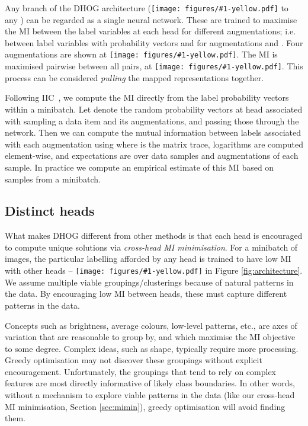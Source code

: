 \documentclass[runningheads]{llncs}
\newcommand*\yellowcircle[1]{\protect\texttt{[image: figures/\#1-yellow.pdf]}}
\begin{document}
Any branch of the DHOG architecture (\yellowcircle{1} to any ) can be regarded as a single neural network. These are trained to maximise the MI between the label variables at each head for different augmentations; i.e. between label variables with probability vectors  and  for augmentations  and . Four augmentations are shown at \yellowcircle{1}. The MI is maximised pairwise between all pairs, at \yellowcircle{4}. This process can be considered \emph{pulling} the mapped representations together.


Following IIC~\cite{ji2019invariant}, we compute the MI directly from the label probability vectors within a minibatch. Let  denote the random probability vectors at head  associated with sampling a data item and its augmentations, and passing those through the network. 
Then we can compute the mutual information between labels associated with each augmentation using
{}
where  is the matrix trace, logarithms are computed element-wise, and expectations are over data samples and augmentations of each sample. In practice we compute an empirical estimate of this MI based on samples from a minibatch.







\subsection{Distinct heads}\label{sec:distinct}
What makes DHOG different from other methods is that each head is encouraged to compute unique solutions via \emph{cross-head MI minimisation}. For a minibatch of images, the particular labelling afforded by any head is trained to have low MI with other heads -- \yellowcircle{5} in Figure \ref{fig:architecture}. We assume multiple viable groupings/clusterings because of natural patterns in the data. By encouraging low MI between heads, these must capture different patterns in the data.


Concepts such as brightness, average colours, low-level patterns, etc., are axes of variation that are reasonable to group by, and which maximise the MI objective to some degree. Complex ideas, such as shape, typically require more processing. Greedy optimisation may not discover these groupings without explicit encouragement. Unfortunately, the groupings that tend to rely on complex features are most directly informative of likely class boundaries. In other words, without a mechanism to explore viable patterns in the data (like our cross-head MI minimisation, Section \ref{sec:mimin}), greedy optimisation will avoid finding them.
\end{document}
